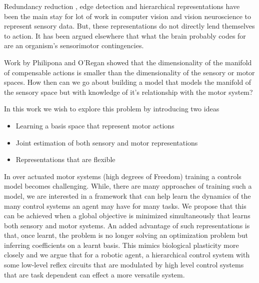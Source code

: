 \documentclass[conference]{IEEEtran}
\begin{document}
\begin{abstract}
\end{abstract}

\IEEEpeerreviewmaketitle




Redundancy reduction \cite{barlow1961possible}, edge detection \cite{hubel1968receptive}  and hierarchical representations \cite{krizhevsky2012imagenet} have been the main stay for lot of work in computer vision and vision neuroscience to represent sensory data. But, these representations do not directly lend themselves to action. It has been argued elsewhere \cite{o2001sensorimotor} that what the brain probably codes for are an organism's sensorimotor contingencies.  

Work by Philipona and O'Regan \cite{philipona2003there,philipona2003perception} showed that the dimensionality of the manifold of compensable actions is smaller than the dimensionality of the sensory or motor spaces. How then can we go about building a model that models the manifold of the sensory space but with knowledge of it's relationship with the motor system? 

In this work we wish to explore this problem by introducing two ideas 
\begin{itemize}
\item Learning a basis space that represent motor actions 
\item Joint estimation of both sensory and motor representations
\item Representations that are flexible
\end{itemize}


In over actuated motor systems (high degrees of Freedom) training a controls model becomes challenging. While, there are many approaches of training such a model, we are interested in a framework that can help learn the dynamics of the many control systems an agent may have for many tasks. We propose that this can be achieved when a global objective is minimized simultaneously that learns  both sensory and motor systems. An added advantage of such representations is that, once learnt, the problem is no longer solving an optimization problem but inferring coefficients on a learnt basis. This mimics biological plasticity \cite{kandel2000principles} more closely and we argue that for a robotic agent, a hierarchical control system with some low-level reflex circuits that are modulated by high level control systems that are task dependent can effect a more versatile system.
\end{document}
